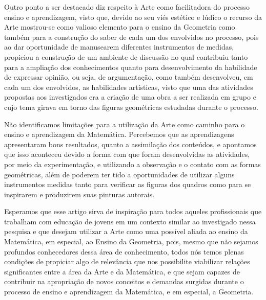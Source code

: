 \begin{refsection}
    Outro ponto a ser destacado diz respeito à Arte como facilitadora do processo ensino e aprendizagem, visto que, devido ao seu viés estético e lúdico o recurso da Arte mostrou-se como valioso elemento para o ensino da Geometria como também para a construção do saber de cada um dos envolvidos no processo, pois ao dar oportunidade de manusearem diferentes instrumentos de medidas, propiciou a construção de um ambiente de discussão no qual contribuiu tanto para a ampliação dos conhecimentos quanto para desenvolvimento da habilidade de expressar opinião, ou seja, de argumentação, como também desenvolveu, em cada um dos envolvidos, as habilidades artísticas, visto que uma das atividades propostas aos investigados era a criação de uma obra a ser realizada em grupo e cujo tema girava em torno das figuras geométricas estudadas durante o processo.  

    Não identificamos limitações para a utilização da Arte como caminho para o ensino e aprendizagem da Matemática. Percebemos que as aprendizagens apresentaram bons resultados, quanto a assimilação dos conteúdos, e apontamos que isso aconteceu devido a forma com que foram desenvolvidas as atividades, por meio da experimentação, e utilizando a observação e o contato com as formas geométricas, além de poderem ter tido a oportunidades de utilizar alguns instrumentos medidas tanto para verificar as figuras dos quadros como para se inspirarem e produzirem suas pinturas autorais. 

    Esperamos que esse artigo sirva de inspiração para todos aqueles profissionais que trabalham com educação de jovens em um contexto similar ao investigado nessa pesquisa e que desejam utilizar a Arte como uma possível aliada ao ensino da Matemática, em especial, ao Ensino da Geometria, pois, mesmo que não sejamos profundos conhecedores dessa área de conhecimento, todos nós temos plenas condições de propiciar algo de relevância que nos possibilite viabilizar relações significantes entre a área da Arte e da Matemática, e que sejam capazes de contribuir na apropriação de novos conceitos e demandas surgidas durante o processo de ensino e aprendizagem da Matemática, e em especial, a Geometria. 

    \printbibliography[heading=subbibliography,notcategory=fullcited]

    \label{chap:matematicanaarteend}

\end{refsection}
